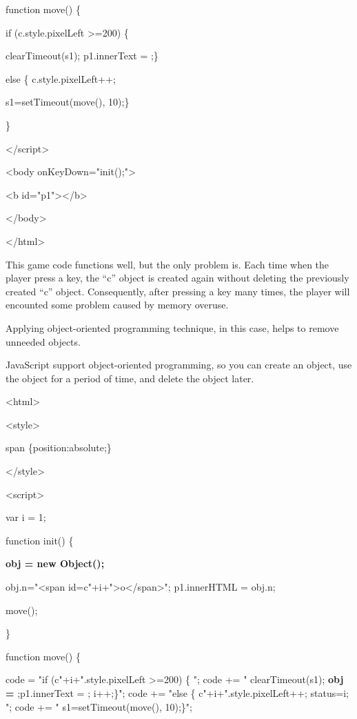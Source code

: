 \documentclass[
]{article}
\begin{document}
\protect\hypertarget{index_split_012.htmlux5cux23p237}{}{}function
move() \{

if (c.style.pixelLeft \textgreater=200) \{

clearTimeout(s1); p1.innerText = \textquotesingle\textquotesingle;\}

else \{ c.style.pixelLeft++;

s1=setTimeout(\textquotesingle move()\textquotesingle, 10);\}

\}

\textless/script\textgreater{}

\textless body onKeyDown="init();"\textgreater{}

\textless b id="p1"\textgreater\textless/b\textgreater{}

\textless/body\textgreater{}

\textless/html\textgreater{}

This game code functions well, but the only problem is. Each time when
the player press a key, the ``c'' object is created again without
deleting the previously created ``c'' object. Consequently, after
pressing a key many times, the player will encounted some problem caused
by memory overuse.

Applying object-oriented programming technique, in this case, helps to
remove unneeded objects.

JavaScript support object-oriented programming, so you can create an
object, use the object for a period of time, and delete the object
later.

\textless html\textgreater{}

\textless style\textgreater{}

span \{position:absolute;\}

\textless/style\textgreater{}

\textless script\textgreater{}

var i = 1;

function init() \{

\textbf{obj = new Object();}

obj.n="\textless span
id=\textquotesingle c"+i+"\textquotesingle\textgreater o\textless/span\textgreater";
p1.innerHTML = obj.n;

move();

\}

function move() \{

code = "if (c"+i+".style.pixelLeft \textgreater=200) \{ "; code += "
clearTimeout(s1); \textbf{obj = \textquotesingle\textquotesingle{}}
;p1.innerText = \textquotesingle\textquotesingle; i++;\}"; code += "else
\{ c"+i+".style.pixelLeft++; status=i; "; code += "
s1=setTimeout(\textquotesingle move()\textquotesingle, 10);\}";
\end{document}
